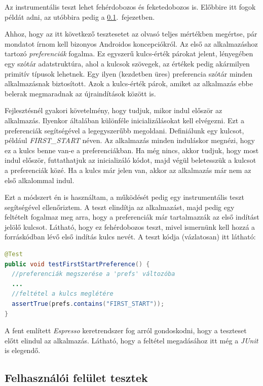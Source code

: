 \documentclass[12pt,a4paper]{article}
\begin{document}
	Az instrumentális teszt lehet fehérdobozos és feketedobozos is. Előbbire itt fogok példát adni, az utóbbira pedig a \ref{felhasznaloi_fel_teszt}.\ fejezetben.
	
	Ahhoz, hogy az itt következő tesztesetet az olvasó teljes mértékben megértse, pár mondatot írnom kell bizonyos Androidos koncepciókról. Az első az alkalmazáshoz tartozó \textit{preferenciák} fogalma. Ez egyszerű kulcs-érték párokat jelent, lényegében egy szótár adatstruktúra, ahol a kulcsok szövegek, az értékek pedig akármilyen primitív típusok lehetnek. Egy ilyen (kezdetben üres) preferencia szótár minden alkalmazásnak biztosított. Azok a kulcs-érték párok, amiket az alkalmazás ebbe belerak megmaradnak az újraindítások között is.
	
	Fejlesztésnél gyakori követelmény, hogy tudjuk, mikor indul először az alkalmazás. Ilyenkor általában különféle inicializálásokat kell elvégezni. Ezt a preferenciák segítségével a legegyszerűbb megoldani. Definiálunk egy kulcsot, például \textit{FIRST\_START} néven. Az alkalmazás minden induláskor megnézi, hogy ez a kulcs benne van-e a preferenciákban.  Ha még nincs, akkor tudjuk, hogy most indul először, futtathatjuk az inicializáló kódot, majd végül beletesszük a kulcsot a preferenciák közé. Ha a kulcs már jelen van, akkor az alkalmazás már nem az első alkalommal indul.
	
	Ezt a módszert én is használtam, a működését pedig egy instrumentális teszt segítségével ellenőriztem. A teszt elindítja az alkalmazást, majd pedig egy feltételt fogalmaz meg arra, hogy a preferenciák már tartalmazzák az első indítást jelölő kulcsot. Látható, hogy ez fehérdobozos teszt, mivel ismernünk kell hozzá a forráskódban lévő első indítás kulcs nevét. A teszt kódja (vázlatosan) itt látható:
	
	\begin{lstlisting}[language=Java]
@Test
public void testFirstStartPreference() {
  //preferenciák megszerése a 'prefs' változóba
  ...
  //feltétel a kulcs meglétére
  assertTrue(prefs.contains("FIRST_START"));
}
	\end{lstlisting}
	
	A fent említett \textit{Espresso} keretrendszer fog arról gondoskodni, hogy a teszteset előtt elindul az alkalmazás. Látható, hogy a feltétel megadásához itt még a \textit{JUnit} is elegendő. 
	
	\subsection{Felhasználói felület tesztek}\label{felhasznaloi_fel_teszt}
	
\end{document}
